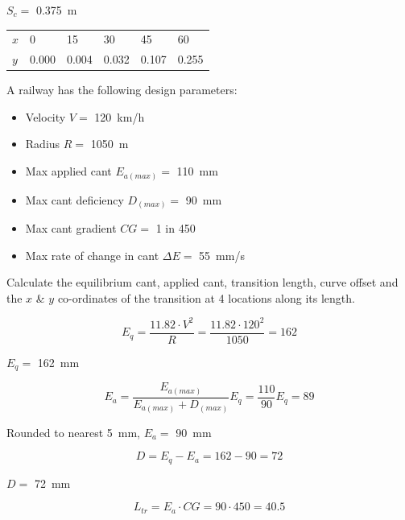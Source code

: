 \documentclass{bcrre_exam}
\begin{document}
\begin{questions}
\begin{solution}
$S_c=$ \qty{0.375}{m}

\vspace{1cm}

\begin{tabular}{@{}llllll@{}}
\toprule
$x$ & \num{0}     & \num{15}    & \num{30}    & \num{45}    & \num{60}    \\ 
$y$ & \num{0.000} & \num{0.004} & \num{0.032} & \num{0.107} & \num{0.255} \\ \bottomrule
\end{tabular}

\end{solution}

\question 
A railway has the following design parameters:

\begin{itemize}
    \item Velocity $V=$ \qty{120}{km/h}
    \item Radius $R=$ \qty{1050}{m}
    \item Max applied cant $E_{a(max)}=$ \qty{110}{mm}
    \item Max cant deficiency $D_{(max)}=$ \qty{90}{mm}
    \item Max cant gradient $CG=$ \num{1} in \num{450}
    \item Max rate of change in cant $\Delta E=$ \qty{55}{mm/s}
\end{itemize}

Calculate the equilibrium cant, applied cant, transition length, curve offset and the $x$ \& $y$ co-ordinates of the transition at 4 locations along its length.

\begin{solution}
\begin{equation}
    E_q=\frac{11.82 \cdot V^2}{R}=\frac{11.82 \cdot 120^2}{1050} = 162
\end{equation}

$E_q=$ \qty{162}{mm}

\begin{equation}
    E_a=\frac{E_{a(max)}}{E_{a(max)}+D_{(max)}}E_q = \frac{110}{90}E_q = 89
\end{equation}

Rounded to nearest \qty{5}{mm}, $E_a=$ \qty{90}{mm}

\begin{equation}
    D=E_q-E_a=162-90=72
\end{equation}

$D=$ \qty{72}{mm}

\begin{equation}
    L_{tr}=E_a \cdot CG = 90 \cdot 450 = 40.5
\end{equation}


\end{solution}
\end{questions}
\end{document}
